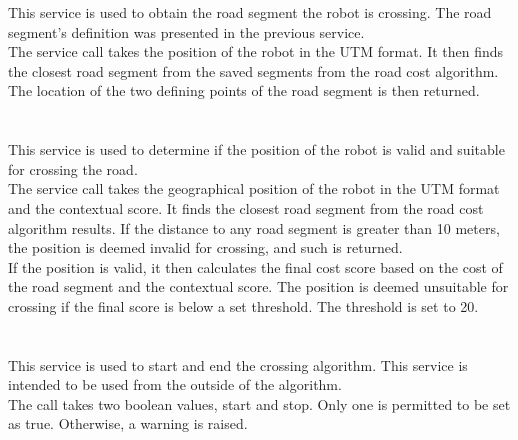            This service is used to obtain the road segment the robot is crossing. The road segment's definition was presented in the previous service.\\
            The service call takes the position of the robot in the UTM format. It then finds the closest road segment from the saved segments from the road cost algorithm. The location of the two defining points of the road segment is then returned.\\\\
        \\
            This service is used to determine if the position of the robot is valid and suitable for crossing the road.\\
            The service call takes the geographical position of the robot in the UTM format and the contextual score. It finds the closest road segment from the road cost algorithm results. If the distance to any road segment is greater than 10 meters, the position is deemed invalid for crossing, and such is returned.\\
            If the position is valid, it then calculates the final cost score based on the cost of the road segment and the contextual score. The position is deemed unsuitable for crossing if the final score is below a set threshold. The threshold is set to 20.\\\\
        \\
            This service is used to start and end the crossing algorithm. This service is intended to be used from the outside of the algorithm.\\
            The call takes two boolean values, start and stop. Only one is permitted to be set as true. Otherwise, a warning is raised.

